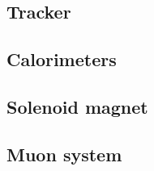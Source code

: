 \subsection{Tracker}


\subsection{Calorimeters}


\subsection{Solenoid magnet}


\subsection{Muon system}


